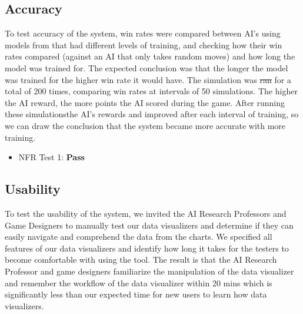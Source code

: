 \documentclass[12pt, titlepage]{article}
\providecommand{\DIFaddtex}[1]{{\protect\color{blue}\uwave{#1}}} %
\providecommand{\DIFdeltex}[1]{{\protect\color{red}\sout{#1}}}                      %
\providecommand{\DIFaddbegin}{} %
\providecommand{\DIFaddend}{} %
\providecommand{\DIFdelbegin}{} %
\providecommand{\DIFdelend}{} %
\providecommand{\DIFadd}[1]{\texorpdfstring{\DIFaddtex{#1}}{#1}} %
\providecommand{\DIFdel}[1]{\texorpdfstring{\DIFdeltex{#1}}{}} %
\begin{document}
\subsection{Accuracy}
To test accuracy of the system, win rates were compared between AI's using models from that had different levels of training, and checking how their win rates compared (against an AI that only takes random moves) and how long the model was trained for. The expected conclusion was that the longer the model was trained for the higher win rate it would have. The simulation was \DIFdelbegin \DIFdel{ran }\DIFdelend \DIFaddbegin \DIFadd{run }\DIFaddend for a total of 200 times, comparing win rates at intervals of 50 simulations. The higher the AI reward, the more points the AI scored during the game. After running these simulations\DIFaddbegin \DIFadd{, }\DIFaddend the AI's rewards and improved after each interval of training, so we can draw the conclusion that the system became more accurate with more training.
\begin{itemize}
    \item NFR Test 1: \textbf{Pass}
\end{itemize}
\begin{center}
\end{center}


\subsection{Usability}
To test the usability of the system, we invited the AI Research Professors and Game Designers to manually test our data visualizers and determine if they can easily navigate and comprehend the data from the charts. We specified all features of our data visualizers and identify how long it takes for the testers to become comfortable with using the tool. The result is that the AI Research Professor and game designers familiarize the manipulation of the data visualizer and remember the workflow of the data visualizer within 20 mins which is significantly less than our expected time for new users to learn how data visualizers. 
\end{document}
